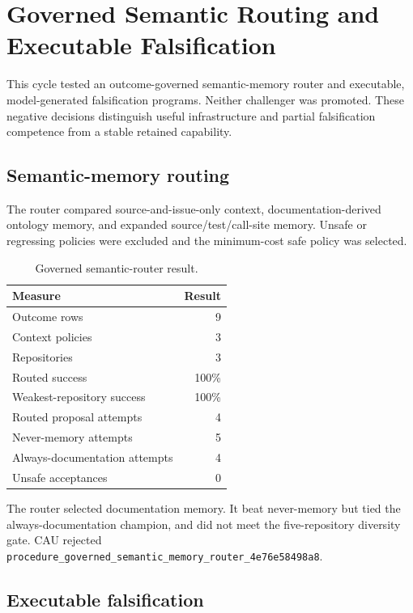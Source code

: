\section{Governed Semantic Routing and Executable Falsification}
\label{sec:semantic-routing-executable-falsification}

This cycle tested an outcome-governed semantic-memory router and executable,
model-generated falsification programs. Neither challenger was promoted. These
negative decisions distinguish useful infrastructure and partial falsification
competence from a stable retained capability.

\subsection{Semantic-memory routing}

The router compared source-and-issue-only context, documentation-derived
ontology memory, and expanded source/test/call-site memory. Unsafe or regressing
policies were excluded and the minimum-cost safe policy was selected.

\begin{table}[ht]
\centering
\caption{Governed semantic-router result.}
\label{tab:semantic-router-results}
\begin{tabular}{lr}
\hline
Measure & Result \\
\hline
Outcome rows & 9 \\
Context policies & 3 \\
Repositories & 3 \\
Routed success & 100\% \\
Weakest-repository success & 100\% \\
Routed proposal attempts & 4 \\
Never-memory attempts & 5 \\
Always-documentation attempts & 4 \\
Unsafe acceptances & 0 \\
\hline
\end{tabular}
\end{table}

The router selected documentation memory. It beat never-memory but tied the
always-documentation champion, and did not meet the five-repository diversity
gate. CAU rejected
\texttt{procedure\_governed\_semantic\_memory\_router\_4e76e58498a8}.

\subsection{Executable falsification}

